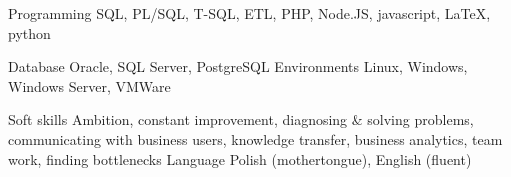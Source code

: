

\begin{cvskills}


  \cvskill
    {Programming} %
    {SQL, PL/SQL, T-SQL, ETL, PHP, Node.JS, javascript, \LaTeX, python} %

  \cvskill
    {Database} %
    {Oracle, SQL Server, PostgreSQL} %
  \cvskill
    {Environments} %
    {Linux, Windows, Windows Server, VMWare} %

  \cvskill
    {Soft skills} %
    {Ambition, constant improvement, diagnosing \& solving problems, communicating with business users, knowledge transfer, business analytics, team work, finding bottlenecks} %
  \cvskill
  	{Language}
  	{Polish (mothertongue), English (fluent)}

\end{cvskills}


